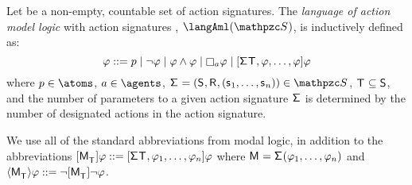 \begin{definition}
Let \aSignatureFamily{} be a non-empty, countable set of action signatures.
The {\em language of action model logic} with action signatures \aSignatureFamily{}, $\langAml(\aSignatureFamily)$, is inductively defined as:
$$
\phi ::=
    \atomP \mid
    \lnot \phi \mid
    \phi \land \phi \mid
    \necessaryA \phi \mid
    \actionA{\aSignature \aStatesT, \phi, \dots, \phi} \phi\\
$$
where $\atomP \in \atoms$, $\agentA \in \agents$, $\aSignatureAndTuple \in \aSignatureFamily$, $\aStatesT \subseteq \aStates$, and the number of parameters to a given action signature $\aSignature$ is determined by the number of designated actions in the action signature.
\end{definition}

We use all of the standard abbreviations from modal logic, in addition to the abbreviations 
$\actionA{\aPModel{\aStatesT}} \phi ::= \actionA{\aSignature \aStatesT, \phi_1, \dots, \phi_n} \phi$ where $\aModel = \aSignature(\phi_1, \dots, \phi_n)$ and 
$\actionE{\aPModel{\aStatesT}} \phi ::= \lnot \actionA{\aPModel{\aStatesT}} \lnot \phi$.

